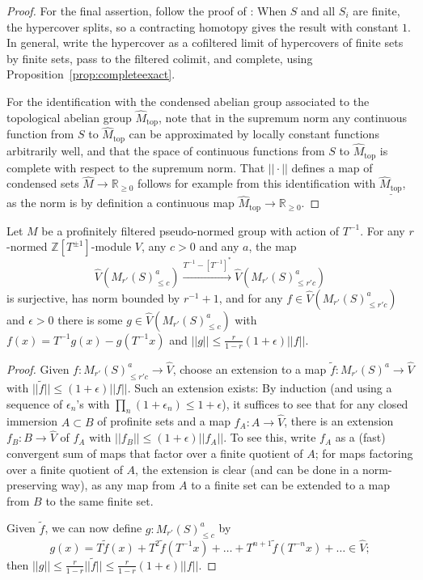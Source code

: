 \begin{proof}
For the final assertion, follow the proof of \cite[Theorem 3.3]{Condensed}: When $S$ and all $S_i$ are finite, the hypercover splits, so a contracting homotopy gives the result with constant $1$. In general, write the hypercover as a cofiltered limit of hypercovers of finite sets by finite sets, pass to the filtered colimit, and complete, using Proposition~\ref{prop:completeexact}.

For the identification with the condensed abelian group associated to the topological abelian group $\widehat{M}_{\mathrm{top}}$, note that in the supremum norm any continuous function from $S$ to $\widehat{M}_{\mathrm{top}}$ can be approximated by locally constant functions arbitrarily well, and that the space of continuous functions from $S$ to $\widehat{M}_{\mathrm{top}}$ is complete with respect to the supremum norm. That $||\cdot||$ defines a map of condensed sets $\widehat{M}\to \mathbb R_{\geq 0}$ follows for example from this identification with $\underline{\widehat{M}_{\mathrm{top}}}$, as the norm is by definition a continuous map $\widehat{M}_{\mathrm{top}}\to \mathbb R_{\geq 0}$.
\end{proof}

\begin{lemma}
  \label{lem:Tinv}
  Let $M$ be a profinitely filtered pseudo-normed group with action of $T^{-1}$.
  For any $r$-normed $\mathbb Z[T^{\pm 1}]$-module $V$, any $c>0$ and any $a$, the map
\[
\widehat{V}(M_{r'}(S)_{\leq c}^a)\xrightarrow{T^{-1}-[T^{-1}]^\ast} \widehat{V}(M_{r'}(S)_{\leq r'c}^a)
\]
is surjective, has norm bounded by $r^{-1}+1$, and for any $f\in \widehat{V}(M_{r'}(S)_{\leq r'c}^a)$ and $\epsilon>0$ there is some $g\in \widehat{V}(M_{r'}(S)_{\leq c}^a)$ with $f(x)=T^{-1}g(x)-g(T^{-1}x)$ and $||g||\leq \frac{r}{1-r}(1+\epsilon) ||f||$.
\end{lemma}

\begin{proof} Given $f: M_{r'}(S)_{\leq r'c}^a\to \widehat{V}$, choose an extension to a map $\tilde{f}: M_{r'}(S)^a\to \widehat{V}$ with $||\tilde{f}||\leq (1+\epsilon)||f||$. Such an extension exists: By induction (and using a sequence of $\epsilon_n$'s with $\prod_n (1+\epsilon_n)\leq 1+\epsilon$), it suffices to see that for any closed immersion $A\subset B$ of profinite sets and a map $f_A: A\to \widehat{V}$, there is an extension $f_B: B\to \widehat{V}$ of $f_A$ with $||f_B||\leq (1+\epsilon)||f_A||$. To see this, write $f_A$ as a (fast) convergent sum of maps that factor over a finite quotient of $A$; for maps factoring over a finite quotient of $A$, the extension is clear (and can be done in a norm-preserving way), as any map from $A$ to a finite set can be extended to a map from $B$ to the same finite set.

Given $\tilde{f}$, we can now define $g: M_{r'}(S)_{\leq c}^a$ by
\[
g(x) = T\tilde{f}(x)+T^2\tilde{f}(T^{-1}x)+\ldots+T^{n+1}\tilde{f}(T^{-n}x)+\ldots\in \widehat{V};
\]
then $||g||\leq \frac r{1-r}||\tilde{f}||\leq \frac r{1-r}(1+\epsilon)||f||$.
\end{proof}

